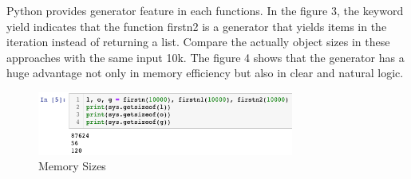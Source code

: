Python provides generator feature in each functions. In the figure 3, the keyword yield indicates that the function firstn2 is a generator that yields items in the iteration instead of returning a list. Compare the actually object sizes in these approaches with the same input 10k. The figure 4 shows that the generator has a huge advantage not only in memory efficiency but also in clear and natural logic. 

%
\begin{figure}[H]
	\centering
	\includegraphics[width=0.75\textwidth]{figures/memsize}
	\caption{Memory Sizes}
\end{figure}
%